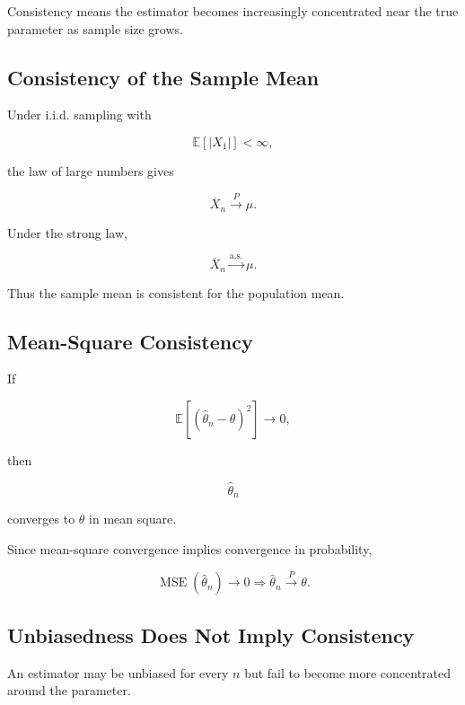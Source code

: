 Consistency means the estimator becomes increasingly concentrated near
the true parameter as sample size grows.

\subsection{Consistency of the Sample Mean}
\label{subsec:consistency-sample-mean}

Under i.i.d. sampling with

\[
\mathbb{E}[|X_1|]<\infty,
\]

the law of large numbers gives

\[
\boxed{
\overline{X}_n
\xrightarrow{P}
\mu.
}
\]

Under the strong law,

\[
\boxed{
\overline{X}_n
\xrightarrow{\text{a.s.}}
\mu.
}
\]

Thus the sample mean is consistent for the population mean.

\subsection{Mean-Square Consistency}
\label{subsec:mean-square-consistency}

If

\[
\mathbb{E}
[
(\widehat{\theta}_n-\theta)^2
]
\to0,
\]

then

\[
\widehat{\theta}_n
\]

converges to \(\theta\) in mean square.

Since mean-square convergence implies convergence in probability,

\[
\boxed{
\operatorname{MSE}(\widehat{\theta}_n)\to0
\Longrightarrow
\widehat{\theta}_n\xrightarrow{P}\theta.
}
\]

\subsection{Unbiasedness Does Not Imply Consistency}
\label{subsec:unbiased-not-consistent}

An estimator may be unbiased for every \(n\) but fail to become more
concentrated around the parameter.


